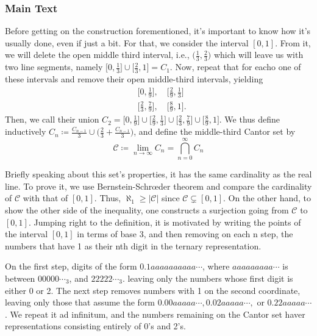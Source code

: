 \documentclass{article}
\begin{document}
\subsubsection{Main Text}
  Before getting on the construction forementioned, it's important to know how it's usually done, even if just a bit. 
For that, we consider the interval $[0, 1].$ From it, we will delete the open middle third interval, i.e., $\biggl(\frac{1}{3}, \frac{2}{3}\biggr)$
which will leave us with two line segments, namely $\biggl[0, \frac{1}{3}\biggr]\cup\biggl[\frac{2}{3}, 1\biggr] = C_{1}.$ Now,
repeat that for eacho one of these intervals and remove their open middle-third intervals, yielding 
\begin{align*}
  &\biggl[0, \frac{1}{9}\biggr],\quad\biggl[\frac{2}{9}, \frac{1}{3}\biggr]\\
  &\biggl[\frac{2}{3}, \frac{7}{9}\biggr],\quad \biggl[\frac{8}{9}, 1\biggr].
\end{align*}
  Then, we call their union $C_{2} = \biggl[0, \frac{1}{9}\biggr]\cup\biggl[\frac{2}{9}, \frac{1}{3}\biggr]\cup\biggl[\frac{2}{3}, \frac{7}{9}\biggr]\cup\biggl[\frac{8}{9}, 1\biggr].$
We thus define inductively $C_{n}\coloneqq\displaystyle \frac{C_{n-1}}{3}\cup\biggl(\frac{2}{3}+\frac{C_{n-1}}{3}\biggr)$, and 
define the middle-third Cantor set by 
  $$
  \boxed{\mathcal{C}\coloneqq \lim_{n\to\infty}C_{n} = \bigcap_{n=0}^{\infty}C_{n}}
  $$

  Briefly speaking about this set's properties, it has the same cardinality as the real line. To prove it, we use Bernstein-Schr\oe der
theorem and compare the cardinality of $\mathcal{C}$ with that of $[0, 1].$ Thus, $\aleph_{1}\geq{|\mathcal{C}|}$ since $\mathcal{C}\subsetneq{[0, 1]}$.
On the other hand, to show the other side of the inequality, one constructs a surjection going from $\mathcal{C}$ to $[0, 1]$.
Jumping right to the definition, it is motivated by writing the points of the interval $[0, 1]$ in terms of base 3, and then removing
on each n step, the numbers that have 1 as their nth digit in the ternary representation.

  On the first step, digits of the form $0.1aaaaaaaaaa\cdots$, where $aaaaaaaaa \cdots$ is between $00000\cdots_{3}$, and $22222 \cdots_{3}.$
leaving only the numbers whose first digit is either 0 or 2. The next step removes numbers with 1 on the second coordinate, leaving only those
that assume the form $0.00aaaaa \cdots,0.02aaaaa \cdots, \text{ or } 0.22aaaaa\cdots$. We repeat it ad infinitum, and the numbers
remaining on the Cantor set haver representations consisting entirely of 0's and 2's.
\end{document}
